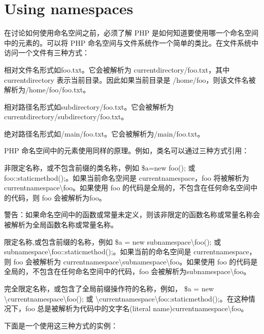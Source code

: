 \chapter{Using namespaces}

在讨论如何使用命名空间之前，必须了解 PHP 是如何知道要使用哪一个命名空间中的元素的。可以将 PHP 命名空间与文件系统作一个简单的类比。在文件系统中访问一个文件有三种方式：

\begin{compactenum}
\item 相对文件名形式如foo.txt。它会被解析为 currentdirectory/foo.txt，其中 currentdirectory 表示当前目录。因此如果当前目录是 /home/foo，则该文件名被解析为/home/foo/foo.txt。
\item 相对路径名形式如subdirectory/foo.txt。它会被解析为 currentdirectory/subdirectory/foo.txt。
\item 绝对路径名形式如/main/foo.txt。它会被解析为/main/foo.txt。
\end{compactenum}

PHP 命名空间中的元素使用同样的原理。例如，类名可以通过三种方式引用：

\begin{compactenum}
\item 非限定名称，或不包含前缀的类名称，例如 \$a=new foo(); 或 foo::staticmethod();。如果当前命名空间是 currentnamespace，foo 将被解析为 currentnamespace\textbackslash foo。如果使用 foo 的代码是全局的，不包含在任何命名空间中的代码，则 foo 会被解析为foo。 

警告：如果命名空间中的函数或常量未定义，则该非限定的函数名称或常量名称会被解析为全局函数名称或常量名称。

\item 限定名称,或包含前缀的名称，例如 \$a = new subnamespace\textbackslash foo(); 或 subnamespace\textbackslash foo::staticmethod();。如果当前的命名空间是 currentnamespace，则 foo 会被解析为 currentnamespace\textbackslash subnamespace\textbackslash foo。如果使用 foo 的代码是全局的，不包含在任何命名空间中的代码，foo 会被解析为subnamespace\textbackslash foo。
\item 完全限定名称，或包含了全局前缀操作符的名称，例如， \$a = new \textbackslash currentnamespace\textbackslash foo(); 或 \textbackslash currentnamespace\textbackslash foo::staticmethod();。在这种情况下，foo 总是被解析为代码中的文字名(literal name)currentnamespace\textbackslash foo。
\end{compactenum}

下面是一个使用这三种方式的实例：

